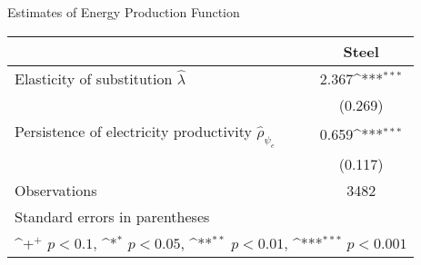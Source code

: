\def\sym#1{\ifmmode^{#1}\else\(^{#1}\)\fi}
\caption{Estimates of Energy Production Function}
\begin{tabular}{l*{1}{c}}
\toprule\hline
& \multicolumn{1}{c}{Steel} \\
\midrule
Elasticity of substitution $\hat\lambda$&2.367\sym{***}\\
&(0.269)\\
Persistence of electricity productivity $\hat\rho_{\psi_e}$&0.659\sym{***}\\
&(0.117)\\
\midrule
Observations&3482\\
\hline\bottomrule
\multicolumn{2}{l}{\footnotesize Standard errors in parentheses} \\
\multicolumn{2}{l}{\footnotesize \sym{+} \(p<0.1\), \sym{*} \(p<0.05\), \sym{**} \(p<0.01\), \sym{***} \(p<0.001\)} \\
\end{tabular}
